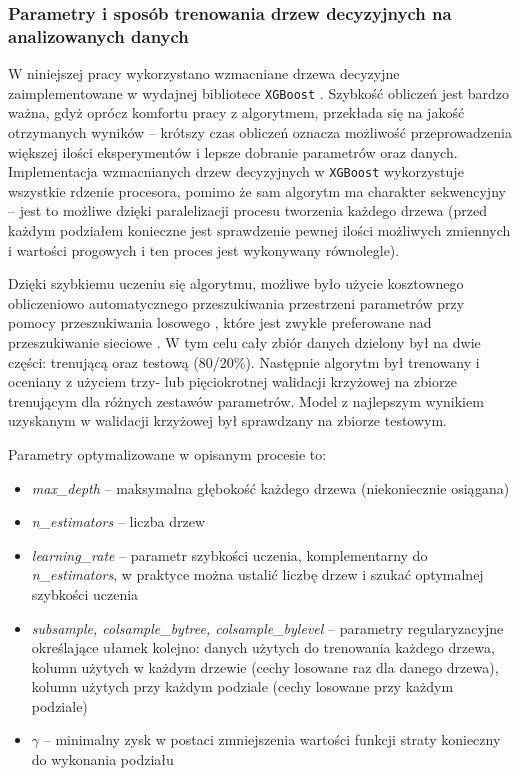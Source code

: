 \subsubsection*{Parametry i sposób trenowania drzew decyzyjnych na analizowanych danych}

W niniejszej pracy wykorzystano wzmacniane drzewa decyzyjne zaimplementowane w wydajnej bibliotece \texttt{XGBoost} \cite{chen16}. Szybkość obliczeń jest bardzo ważna, gdyż oprócz komfortu pracy z algorytmem, przekłada się
na jakość otrzymanych wyników -- krótszy czas obliczeń oznacza możliwość przeprowadzenia większej ilości eksperymentów i lepsze dobranie parametrów oraz danych.
Implementacja wzmacnianych drzew decyzyjnych w \texttt{XGBoost} wykorzystuje wszystkie rdzenie procesora, pomimo że sam algorytm ma charakter sekwencyjny -- jest to możliwe dzięki paralelizacji procesu tworzenia każdego drzewa (przed każdym podziałem konieczne jest sprawdzenie pewnej ilości możliwych zmiennych i wartości progowych i ten proces jest wykonywany równolegle).

Dzięki szybkiemu uczeniu się algorytmu, możliwe było użycie kosztownego obliczeniowo automatycznego przeszukiwania przestrzeni parametrów przy pomocy przeszukiwania losowego , które jest zwykle preferowane nad przeszukiwanie sieciowe \cite{bergstra12}. W tym celu cały zbiór danych dzielony był na dwie części: trenującą oraz testową (80/20\%). Następnie algorytm był trenowany i oceniany z użyciem trzy- lub pięciokrotnej walidacji krzyżowej  na zbiorze trenującym dla różnych zestawów parametrów. Model z najlepszym wynikiem uzyskanym w walidacji krzyżowej był sprawdzany na zbiorze testowym.

Parametry optymalizowane w opisanym procesie to:
\begin{itemize}
	\item \textit{max\_depth} -- maksymalna głębokość każdego drzewa (niekoniecznie osiągana)
	\item \textit{n\_estimators} -- liczba drzew
	\item \textit{learning\_rate} -- parametr szybkości uczenia, komplementarny do \textit{n\_estimators}, w praktyce można ustalić liczbę drzew i szukać optymalnej szybkości uczenia
	\item \textit{subsample, colsample\_bytree, colsample\_bylevel} -- parametry regularyzacyjne określające ułamek kolejno: danych użytych do trenowania każdego drzewa, kolumn użytych w każdym drzewie (cechy losowane raz dla danego drzewa), kolumn użytych przy każdym podziale (cechy losowane przy każdym podziale)
	 \item $\gamma$ -- minimalny zysk w postaci zmniejszenia wartości funkcji straty konieczny do wykonania podziału
\end{itemize}


